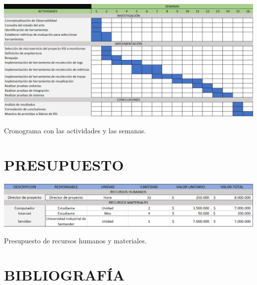 \documentclass[a4paper,12pt]{article}
\begin{document}
\renewcommand{\tablename}{Tabla}

\begin{table}[H]
    \centering
    \includegraphics[width=1\textwidth]{images/cronograma-plan.PNG}
    \captionsetup{justification=centering} %
    \caption{Cronograma con las actividades y las semanas.}
    \label{tab:cronograma}
\end{table}														

\section{\large PRESUPUESTO}

\begin{table}[H]
    \centering
    \includegraphics[width=1\textwidth]{images/presupuesto-plan.PNG}
    \captionsetup{justification=centering} %
    \caption{Presupuesto de recursos humanos y materiales.}
    \label{tab:presupuesto}
\end{table}

\newpage
\section{\large BIBLIOGRAFÍA}

\printbibliography
\end{document}
